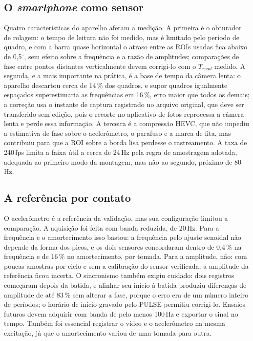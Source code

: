 \documentclass[a4paper,10pt,twocolumn]{article}
\begin{document}
\subsection{O \textit{smartphone} como sensor}

Quatro características do aparelho afetam a medição. A primeira é o obturador de rolagem: o tempo de leitura não foi medido, mas é limitado pelo período de quadro, e com a barra quase horizontal o atraso entre as ROIs usadas fica abaixo de 0,5$^\circ$, sem efeito sobre a frequência e a razão de amplitudes; comparações de fase entre pontos distantes verticalmente devem corrigi-lo com o $T_{read}$ medido. A segunda, e a mais importante na prática, é a base de tempo da câmera lenta: o aparelho descartou cerca de 14\,\% dos quadros, e supor quadros igualmente espaçados superestimaria as frequências em 16\,\%, erro maior que todos os demais; a correção usa o instante de captura registrado no arquivo original, que deve ser transferido sem edição, pois o recorte no aplicativo de fotos reprocessa a câmera lenta e perde essa informação. A terceira é a compressão HEVC, que não impediu a estimativa de fase sobre o acelerômetro, o parafuso e a marca de fita, mas contribuiu para que a ROI sobre a borda lisa perdesse o rastreamento. A taxa de 240\,fps limita a faixa útil a cerca de 24\,Hz pela regra de amostragem adotada, adequada ao primeiro modo da montagem, mas não ao segundo, próximo de 80\,Hz.

\subsection{A referência por contato}

O acelerômetro é a referência da validação, mas sua configuração limitou a comparação. A aquisição foi feita com banda reduzida, de 20\,Hz. Para a frequência e o amortecimento isso bastou: a frequência pelo ajuste senoidal não depende da forma dos picos, e os dois sensores concordaram dentro de 0,4\,\% na frequência e de 16\,\% no amortecimento, por tomada. Para a amplitude, não: com poucas amostras por ciclo e sem a calibração do sensor verificada, a amplitude da referência ficou incerta. O sincronismo também exigiu cuidado: dois registros começaram depois da batida, e alinhar seu início à batida produziu diferenças de amplitude de até 83\,\% sem alterar a fase, porque o erro era de um número inteiro de períodos; o horário de início gravado pelo PULSE permitiu corrigi-lo. Ensaios futuros devem adquirir com banda de pelo menos 100\,Hz e exportar o sinal no tempo. Também foi essencial registrar o vídeo e o acelerômetro na mesma excitação, já que o amortecimento variou de uma tomada para outra.
\end{document}
